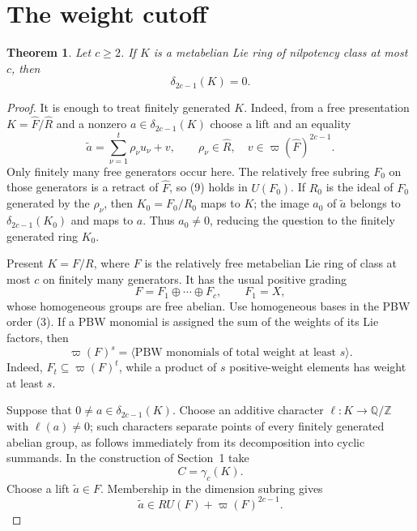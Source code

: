 \documentclass[11pt]{amsart}
\newtheorem{theorem}{Theorem}[section]
\theoremstyle{remark}
\newcommand{\Z}{\mathbb Z}
\newcommand{\Q}{\mathbb Q}
\newcommand{\aug}{\varpi}
\newcommand{\gm}{\gamma}
\begin{document}
\section{The weight cutoff}

\begin{theorem}\label{thm:nilpotent}
Let $c\geq2$.  If $K$ is a metabelian Lie ring of nilpotency class at
most $c$, then
\[
                              \delta_{2c-1}(K)=0.
\]
\end{theorem}

\begin{proof}
It is enough to treat finitely generated $K$.  Indeed, from a free
presentation $K=\widehat F/\widehat R$ and a nonzero
$a\in\delta_{2c-1}(K)$ choose a lift and an equality
\[
 \widetilde a=\sum_{\nu=1}^t\rho_\nu u_\nu+v,
 \qquad \rho_\nu\in\widehat R,
 \quad v\in\aug(\widehat F)^{2c-1}.                       \tag{9}
\]
Only finitely many free generators occur here.  The relatively free
subring $F_0$ on those generators is a retract of $\widehat F$, so
(9) holds in $U(F_0)$.  If $R_0$ is the ideal of $F_0$ generated by
the $\rho_\nu$, then $K_0=F_0/R_0$ maps to $K$; the image $a_0$ of
$\widetilde a$ belongs to $\delta_{2c-1}(K_0)$ and maps to $a$.
Thus $a_0\ne0$, reducing the question to the finitely generated ring
$K_0$.

Present $K=F/R$, where $F$ is the relatively free metabelian Lie ring
of class at most $c$ on finitely many generators.  It has the usual
positive grading
\[
             F=F_1\oplus\cdots\oplus F_c,
             \qquad F_1=X,
\]
whose homogeneous groups are free abelian.  Use homogeneous bases in
the PBW order (3).  If a PBW monomial is assigned the sum of the
weights of its Lie factors, then
\begin{equation}
          \aug(F)^s=
          \langle\text{PBW monomials of total weight at least }s\rangle.
                                                               \tag{10}
\end{equation}
Indeed, $F_t\subseteq\aug(F)^t$, while a product of $s$ positive-weight
elements has weight at least $s$.

Suppose that $0\ne a\in\delta_{2c-1}(K)$.  Choose an additive character
$\ell:K\to\Q/\Z$ with $\ell(a)\ne0$; such characters separate points
of every finitely generated abelian group, as follows immediately from
its decomposition into cyclic summands.  In the construction of
Section~1 take
\[
                              C=\gm_c(K).
\]
Choose a lift $\widetilde a\in F$.  Membership in the dimension
subring gives
\begin{equation}
             \widetilde a\in RU(F)+\aug(F)^{2c-1}.       \tag{11}
\end{equation}


\end{proof}
\end{document}
